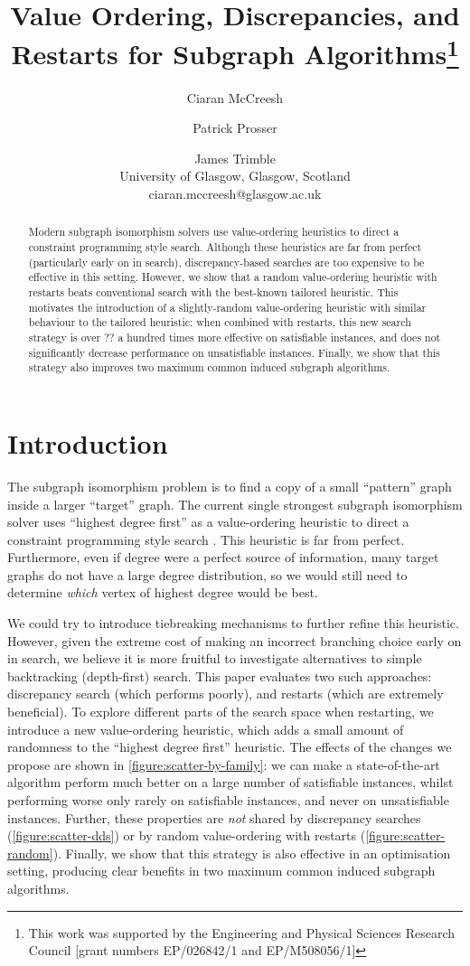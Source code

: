 \documentclass{article}
\title{Value Ordering, Discrepancies, and Restarts for Subgraph Algorithms\thanks{This work was
supported by the Engineering and Physical Sciences Research Council [grant numbers EP/026842/1 and EP/M508056/1]}}
\author{Ciaran McCreesh \and Patrick Prosser \and James Trimble\\ University of Glasgow, Glasgow, Scotland \\
    ciaran.mccreesh@glasgow.ac.uk}
\newcommand{\citep}[1]{\cite{#1}}
\begin{document}
\maketitle

\begin{abstract}
    Modern subgraph isomorphism solvers use value-ordering heuristics to direct a constraint
    programming style search. Although these heuristics are far from perfect (particularly early on
    in search), discrepancy-based searches are too expensive to be effective in this setting.
    However, we show that a random value-ordering heuristic with restarts beats conventional search
    with the best-known tailored heuristic. This motivates the introduction of a slightly-random
    value-ordering heuristic with similar behaviour to the tailored heuristic: when combined with
    restarts, this new search strategy is over ?? a hundred times more effective on satisfiable
    instances, and does not significantly decrease performance on unsatisfiable instances. Finally,
    we show that this strategy also improves two maximum common induced subgraph algorithms.
\end{abstract}

\section{Introduction}

The subgraph isomorphism problem is to find a copy of a small ``pattern'' graph inside a larger
``target'' graph.  The current single strongest subgraph isomorphism solver uses ``highest degree
first'' as a value-ordering heuristic to direct a constraint programming style search
\citep{DBLP:conf/cp/McCreeshP15,DBLP:conf/lion/KotthoffMS16,DBLP:conf/ijcai/McCreeshPT16}. This
heuristic is far from perfect. Furthermore, even if degree were a perfect source of information,
many target graphs do not have a large degree distribution, so we would still need to determine
\emph{which} vertex of highest degree would be best.

We could try to introduce tiebreaking mechanisms to further refine this heuristic. However, given
the extreme cost of making an incorrect branching choice early on in search, we believe it is more
fruitful to investigate alternatives to simple backtracking (depth-first) search. This paper
evaluates two such approaches: discrepancy search (which performs poorly), and restarts (which are
extremely beneficial). To explore different parts of the search space when restarting, we introduce
a new value-ordering heuristic, which adds a small amount of randomness to the ``highest degree
first'' heuristic.  The effects of the changes we propose are shown in
\cref{figure:scatter-by-family}: we can make a state-of-the-art algorithm perform much better on a
large number of satisfiable instances, whilst performing worse only rarely on satisfiable instances,
and never on unsatisfiable instances.  Further, these properties are \emph{not} shared by
discrepancy searches (\cref{figure:scatter-dds}) or by random value-ordering with restarts
(\cref{figure:scatter-random}). Finally, we show that this strategy is also effective in an
optimisation setting, producing clear benefits in two maximum common induced subgraph algorithms.
\end{document}
